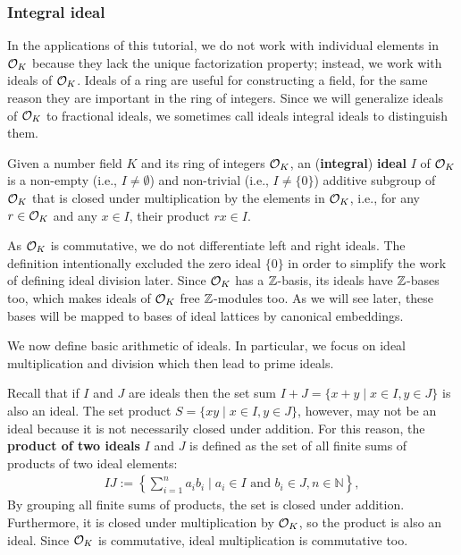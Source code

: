 \documentclass[../main.tex]{subfiles}
\begin{document}
\subsubsection{Integral ideal}
In the applications of this tutorial, we do not work with individual elements in $\mathcal{O}_K$ because they lack the unique factorization property; instead, we work with ideals of $\mathcal{O}_K$.
Ideals of a ring are useful for constructing a field, for the same reason they are important in the ring of integers. 
Since we will generalize ideals of $\mathcal{O}_K$ to fractional ideals, we sometimes call ideals integral ideals to distinguish them. 
	
\begin{definition}
Given a number field $K$ and its ring of integers $\mathcal{O}_K$, an 
\reversemarginpar
{}
(\textbf{integral}) \textbf{ideal} $I$ of $\mathcal{O}_K$ is a non-empty (i.e., $I \neq \emptyset$) and non-trivial (i.e., $I \neq \{0\}$) additive subgroup of $\mathcal{O}_K$ that is closed under multiplication by the elements in $\mathcal{O}_K$, i.e., for any $r \in \mathcal{O}_K$ and any $x \in I$, their product $rx \in I$. 
\end{definition}

As $\mathcal{O}_K$ is commutative, we do not differentiate left and right ideals. 
The definition intentionally excluded the zero ideal $\{0\}$ in order to simplify the work of defining ideal division later.
Since $\mathcal{O}_K$ has a $\mathbb{Z}$-basis, its ideals have $\mathbb{Z}$-bases too, which makes ideals of $\mathcal{O}_K$ free $\mathbb{Z}$-modules too. As we will see later, these bases will be mapped to bases of ideal lattices by canonical embeddings. 
	
We now define basic arithmetic of ideals. In particular, we focus on ideal multiplication and division which then lead to prime ideals. 

Recall that if $I$ and $J$ are ideals then the set sum $I+J = \{x + y \mid x\in I, y\in J\}$ is also an ideal.  The set product $S = \{xy \mid x \in I, y \in J\}$, however, may not be an ideal because it is not necessarily closed under addition. For this reason, the \textbf{product of two ideals} $I$ and $J$ is defined as the set of all finite sums of products of two ideal elements:
\reversemarginpar
{}
\begin{align*}
    IJ := \left\{\sum_{i = 1}^n a_i b_i \mid a_i \in I \text{ and } b_i \in J, n \in \mathbb{N} \right\},
\end{align*}
By grouping all finite sums of products, the set is closed under addition. Furthermore, it is closed under multiplication by $\mathcal{O}_K$, so the product is also an ideal. Since $\mathcal{O}_K$ is commutative, ideal multiplication is commutative too. 
	
\end{document}
